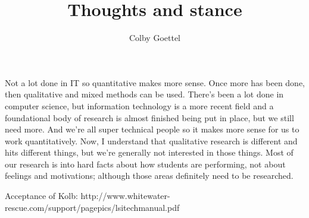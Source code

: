 \documentclass[12pt]{article}
\title{Thoughts and stance}
\author{Colby Goettel}
\begin{document}
\maketitle

Not a lot done in IT so quantitative makes more sense. Once more has been done, then qualitative and mixed methods can be used. There's been a lot done in computer science, but information technology is a more recent field and a foundational body of research is almost finished being put in place, but we still need more. And we're all super technical people so it makes more sense for us to work quantitatively. Now, I understand that qualitative research is different and hits different things, but we're generally not interested in those things. Most of our research is into hard facts about how students are performing, not about feelings and motivations; although those areas definitely need to be researched.

Acceptance of Kolb: http://www.whitewater-rescue.com/support/pagepics/lsitechmanual.pdf
\end{document}

